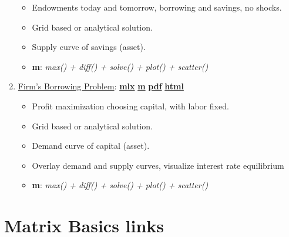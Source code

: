 \documentclass[
]{book}
\providecommand{\tightlist}{%
  \setlength{\itemsep}{0pt}\setlength{\parskip}{0pt}}
\begin{document}
\begin{enumerate}
  \begin{itemize}
  \tightlist
  \item
    Endowments today and tomorrow, borrowing and savings, no shocks.
  \item
    Grid based or analytical solution.
  \item
    Supply curve of savings (asset).
  \item
    \textbf{m}: \emph{max() + diff() + solve() + plot() + scatter()}
  \end{itemize}
\item
  \href{https://fanwangecon.github.io/Math4Econ/derivative_application/htmlpdfm/K_borrow_firm.html}{Firm's Borrowing Problem}: \href{https://github.com/FanWangEcon/Math4Econ/blob/master/derivative_application/K_borrow_firm.mlx}{\textbf{mlx}} \textbar{} \href{https://github.com/FanWangEcon/Math4Econ/blob/master/derivative_application/htmlpdfm/K_borrow_firm.m}{\textbf{m}} \textbar{} \href{https://github.com/FanWangEcon/Math4Econ/blob/master/derivative_application/htmlpdfm/K_borrow_firm.pdf}{\textbf{pdf}} \textbar{} \href{https://fanwangecon.github.io/Math4Econ/derivative_application/htmlpdfm/K_borrow_firm.html}{\textbf{html}}

  \begin{itemize}
  \tightlist
  \item
    Profit maximization choosing capital, with labor fixed.
  \item
    Grid based or analytical solution.
  \item
    Demand curve of capital (asset).
  \item
    Overlay demand and supply curves, visualize interest rate equilibrium
  \item
    \textbf{m}: \emph{max() + diff() + solve() + plot() + scatter()}
  \end{itemize}
\end{enumerate}

\hypertarget{matrix-basics-links}{%
\section{Matrix Basics links}\label{matrix-basics-links}}
\end{document}
